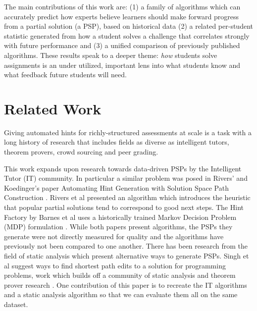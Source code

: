 The main contributions of this work are:
(1) a family of algorithms which can accurately predict how experts believe learners should make forward progress from a partial solution (a PSP), based on historical data (2) a related per-student statistic generated from how a student solves a challenge that correlates strongly with future performance and (3) a unified comparison of previously published algorithms. These results speak to a deeper theme: \emph{how} students solve assignments is an under utilized, important lens into what students know and what feedback future students will need.

\section{Related Work}

Giving automated hints for richly-structured assessments at scale is a task with a long history of research that includes fields as diverse as intelligent tutors, theorem provers, crowd sourcing and peer grading.

This work expands upon research towards data-driven PSPs by the Intelligent Tutor (IT) community. In particular a similar problem was posed in Rivers' and Koedinger's paper Automating Hint Generation with Solution Space Path Construction \cite{rivers2014automating}. Rivers et al presented an algorithm which introduces the heuristic that popular partial solutions tend to correspond to good next steps. The Hint Factory by Barnes et al uses a historically trained Markov Decision Problem (MDP) formulation \cite{barnes2008toward}. While both papers present algorithms, the PSPs they generate were not directly measured for quality and the algorithms have previously not been compared to one another. There has been research from the field of static analysis which present alternative ways to generate PSPs. Singh et al suggest ways to find shortest path edits to a solution for programming problems, work which builds off a community of static analysis and theorem prover research \cite{singh2013automated}  \cite{cheang2003automated}. One contribution of this paper is to recreate the IT algorithms and a static analysis algorithm so that we can evaluate them all on the same dataset. 


